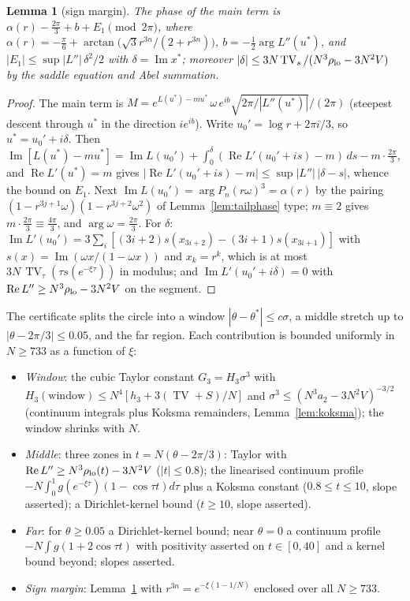 \documentclass[11pt,reqno]{amsart}
\theoremstyle{plain}
\newtheorem{lemma}[theorem]{Lemma}
\theoremstyle{definition}
\DeclareMathOperator{\TV}{TV}
\renewcommand{\Re}{\operatorname{Re}}
\renewcommand{\Im}{\operatorname{Im}}
\begin{document}
\begin{lemma}[sign margin]\label{lem:phase}
The phase of the main term is $\alpha(r)-\frac{2\pi}3+b+E_1\pmod{2\pi}$, where $\alpha(r)=-\frac\pi6+\arctan\big(\sqrt3r^{3n}/(2+r^{3n})\big)$,
$b=-\frac12\arg L''(u^*)$, and $|E_1|\le\sup|L''|\,\delta^2/2$ with $\delta=\Im x^*$; moreover
$|\delta|\le3N\TV_s/(N^3\rho_{\rm lo}-3N^2V)$ by the saddle equation and Abel summation.
\end{lemma}
\begin{proof}
The main term is $M=e^{L(u^*)-mu^*}\,\omega\,e^{ib}\sqrt{2\pi/|L''(u^*)|}/(2\pi)$ (steepest descent through $u^*$ in the direction
$ie^{ib}$). Write $u_0'=\log r+2\pi i/3$, so $u^*=u_0'+i\delta$. Then
$\Im[L(u^*)-mu^*]=\Im L(u_0')+\int_0^\delta(\Re L'(u_0'+is)-m)\,ds-m\cdot\frac{2\pi}3$, and $\Re L'(u^*)=m$ gives
$|\Re L'(u_0'+is)-m|\le\sup|L''|\,|\delta-s|$, whence the bound on $E_1$. Next $\Im L(u_0')=\arg P_n(r\omega)^3=\alpha(r)$ by the
pairing $(1-r^{3j+1}\omega)(1-r^{3j+2}\omega^2)$ of Lemma~\ref{lem:tailphase} type; $m\equiv2$ gives $m\cdot\frac{2\pi}3\equiv\frac{4\pi}3$,
and $\arg\omega=\frac{2\pi}3$. For $\delta$: $\Im L'(u_0')=3\sum_i[(3i+2)s(x_{3i+2})-(3i+1)s(x_{3i+1})]$ with
$s(x)=\Im(\omega x/(1-\omega x))$ and $x_k=r^k$, which is at most $3N\,\TV_\tau(\tau s(e^{-\xi\tau}))$ in modulus; and
$\Im L'(u_0'+i\delta)=0$ with $\Re L''\ge N^3\rho_{\rm lo}-3N^2V$ on the segment.
\end{proof}

The certificate splits the circle into a window $|\theta-\theta^*|\le c\sigma$, a middle stretch up to $|\theta-2\pi/3|\le0.05$,
and the far region. Each contribution is bounded uniformly in $N\ge733$ as a function of $\xi$:

\begin{itemize}
\item \emph{Window}: the cubic Taylor constant $G_3=H_3\sigma^3$ with $H_3(\text{window})\le N^4[h_3+3(\TV+S)/N]$ and
$\sigma^3\le(N^3a_2-3N^2V)^{-3/2}$ (continuum integrals plus Koksma remainders, Lemma~\ref{lem:koksma}); the window shrinks with $N$.
\item \emph{Middle}: three zones in $t=N(\theta-2\pi/3)$: Taylor with $\Re L''\ge N^3\rho_{\rm lo}(t)-3N^2V$ ($|t|\le0.8$);
the linearised continuum profile $-N\int_0^1 g(e^{-\xi\tau})(1-\cos\tau t)d\tau$ plus a Koksma constant ($0.8\le t\le10$, slope asserted);
a Dirichlet-kernel bound ($t\ge10$, slope asserted).
\item \emph{Far}: for $\theta\ge0.05$ a Dirichlet-kernel bound; near $\theta=0$ a continuum profile $-N\int g(1+2\cos\tau t)$ with
positivity asserted on $t\in[0,40]$ and a kernel bound beyond; slopes asserted.
\item \emph{Sign margin}: Lemma~\ref{lem:phase} with $r^{3n}=e^{-\xi(1-1/N)}$ enclosed over all $N\ge733$.
\end{itemize}
\end{document}
